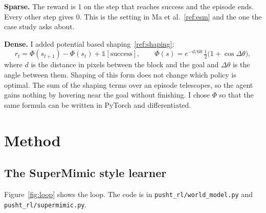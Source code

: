 \documentclass[11pt,a4paper]{article}
\renewcommand{\cite}[1]{\ref{ref:#1}}
\begin{document}
\textbf{Sparse.} The reward is 1 on the step that reaches success and the episode ends. Every other
step gives 0. This is the setting in Ma et al.~\cite{esm} and the one the case study asks about.

\textbf{Dense.} I added potential based shaping~\cite{shaping}:
\begin{equation}
  r_t = \Phi(s_{t+1}) - \Phi(s_t) + \mathbb{1}[\text{success}],
  \qquad
  \Phi(s) = e^{-d/60}\,\tfrac{1}{2}\big(1+\cos\Delta\theta\big),
\end{equation}
where $d$ is the distance in pixels between the block and the goal and $\Delta\theta$ is the angle
between them. Shaping of this form does not change which policy is optimal. The sum of the shaping
terms over an episode telescopes, so the agent gains nothing by hovering near the goal without
finishing. I chose $\Phi$ so that the same formula can be written in PyTorch and differentiated.

\section{Method}
\label{sec:method}

\subsection{The SuperMimic style learner}

Figure~\ref{fig:loop} shows the loop. The code is in \texttt{pusht\_rl/world\_model.py} and
\texttt{pusht\_rl/supermimic.py}.
\end{document}
